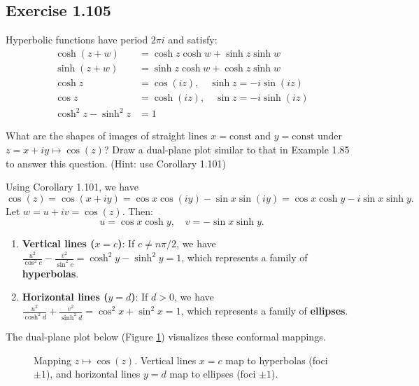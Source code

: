 \documentclass{article}
\begin{document}
\subsection{Exercise 1.105}

\begin{corollary}
  Hyperbolic functions have period $2\pi i$ and satisfy:
  \begin{align*}
    \cosh(z+w)       & = \cosh z \cosh w + \sinh z \sinh w \\
    \sinh(z+w)       & = \sinh z \cosh w + \cosh z \sinh w \\
    \cosh z          & = \cos(iz), \quad \sinh z = -i \sin(iz) \\
    \cos z           & = \cosh(iz), \quad \sin z = -i \sinh(iz) \\
    \cosh^2 z - \sinh^2 z & = 1
  \end{align*}
\end{corollary}

What are the shapes of images of straight lines $x = \text{const}$
and $y = \text{const}$ under $z = x + iy \mapsto \cos(z)$? Draw a
dual-plane plot similar to that in Example 1.85 to answer this
question. (Hint: use Corollary 1.101)

\begin{solution}
  Using Corollary 1.101, we have
  \[
    \cos(z) = \cos(x + iy) = \cos x \cos(iy) - \sin x \sin(iy) = \cos x \cosh y - i \sin x \sinh y.
  \]
  Let $w = u + iv = \cos(z)$. Then:
  \[
    u = \cos x \cosh y, \quad v = -\sin x \sinh y.
  \]
  
  \begin{enumerate}
    \item \textbf{Vertical lines ($x = c$)}:
    If $c \neq n\pi/2$, we have $\frac{u^2}{\cos^2 c} - \frac{v^2}{\sin^2 c} = \cosh^2 y - \sinh^2 y = 1$, which represents a family of \textbf{hyperbolas}.
    \item \textbf{Horizontal lines ($y = d$)}:
    If $d > 0$, we have $\frac{u^2}{\cosh^2 d} + \frac{v^2}{\sinh^2 d} = \cos^2 x + \sin^2 x = 1$, which represents a family of \textbf{ellipses}.
  \end{enumerate}

  The dual-plane plot below (Figure \ref{fig:mapping_cos}) visualizes these conformal mappings.

  \begin{figure}[htbp]
    \centering
    \resizebox{0.9\textwidth}{!}{}
    \caption{Mapping $z \mapsto \cos(z)$. Vertical lines $x=c$ map to hyperbolas (foci $\pm 1$), and horizontal lines $y=d$ map to ellipses (foci $\pm 1$).}
    \label{fig:mapping_cos}
  \end{figure}
\end{solution}
\end{document}
